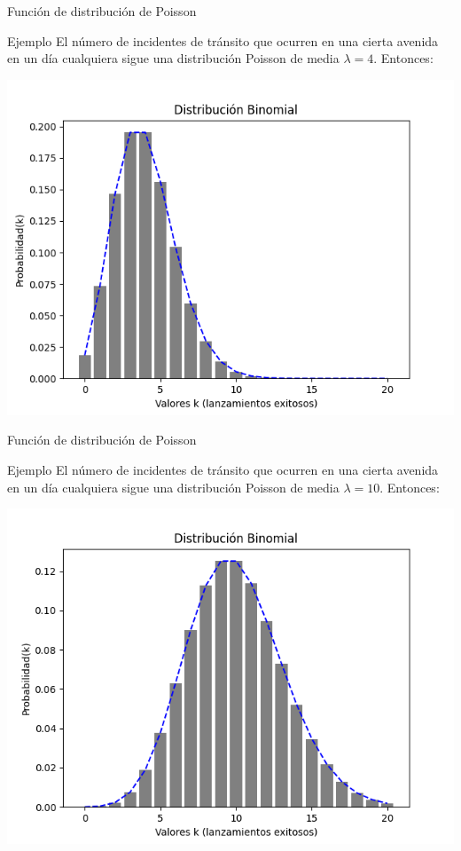 \documentclass{beamer}
\begin{document}
\begin{frame}{Función de distribución de Poisson}
  \begin{block}{Ejemplo}
    El número de incidentes de tránsito que ocurren en una cierta avenida en un día
    cualquiera sigue una distribución Poisson de media $\lambda=4$. Entonces:
  \end{block}
  \begin{center}
    \includegraphics[scale=0.5]{figures/poisson_distribution_lambda_4.png}
  \end{center}
\end{frame}

\begin{frame}{Función de distribución de Poisson}
  \begin{block}{Ejemplo}
    El número de incidentes de tránsito que ocurren en una cierta avenida en un día
    cualquiera sigue una distribución Poisson de media $\lambda=10$. Entonces:
  \end{block}
  \begin{center}
    \includegraphics[scale=0.5]{figures/poisson_distribution_lambda_10.png}
  \end{center}
\end{frame}
\end{document}
